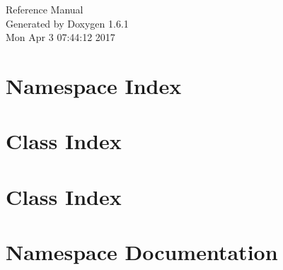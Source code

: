 \documentclass[a4paper]{book}
\begin{document}
\hypersetup{pageanchor=false}
\begin{titlepage}
\vspace*{7cm}
\begin{center}
{\Large Reference Manual}\\
\vspace*{1cm}
{\large Generated by Doxygen 1.6.1}\\
\vspace*{0.5cm}
{\small Mon Apr 3 07:44:12 2017}\\
\end{center}
\end{titlepage}
\clearemptydoublepage
{}
\tableofcontents
\clearemptydoublepage
{}
\hypersetup{pageanchor=true}
\chapter{Namespace Index}

\chapter{Class Index}

\chapter{Class Index}

\chapter{Namespace Documentation}


















\end{document}
